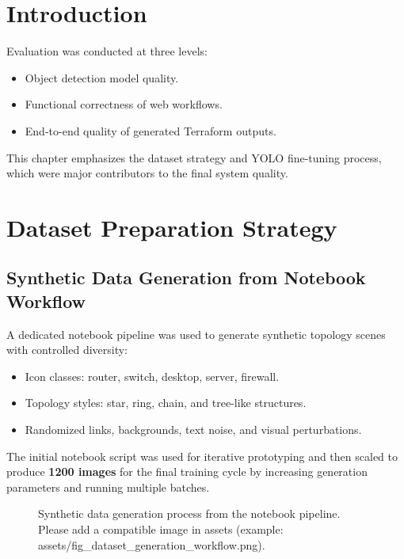 \documentclass[12pt,a4paper,openany]{report}
\begin{document}
\section{Introduction}

Evaluation was conducted at three levels:
\begin{itemize}
    \item Object detection model quality.
    \item Functional correctness of web workflows.
    \item End-to-end quality of generated Terraform outputs.
\end{itemize}

This chapter emphasizes the dataset strategy and YOLO fine-tuning process, which were major contributors to the final system quality.

\section{Dataset Preparation Strategy}

\subsection{Synthetic Data Generation from Notebook Workflow}

A dedicated notebook pipeline was used to generate synthetic topology scenes with controlled diversity:
\begin{itemize}
    \item Icon classes: router, switch, desktop, server, firewall.
    \item Topology styles: star, ring, chain, and tree-like structures.
    \item Randomized links, backgrounds, text noise, and visual perturbations.
\end{itemize}

The initial notebook script was used for iterative prototyping and then scaled to produce \textbf{1200 images} for the final training cycle by increasing generation parameters and running multiple batches.

\begin{figure}[H]
    \centering
    \caption{Synthetic data generation process from the notebook pipeline. Please add a compatible image in assets (example: assets/fig_dataset_generation_workflow.png).}
    \label{fig:dataset_generation_workflow}
\end{figure}
\end{document}
